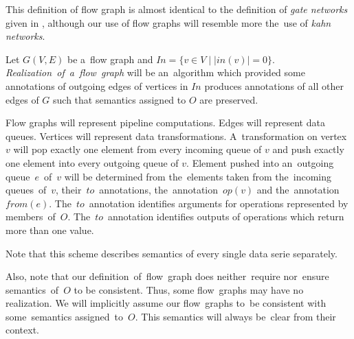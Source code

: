 This definition of flow graph is almost identical to the definition of \emph{gate networks} given in \cite{ads}, although our use of flow graphs will resemble more the~use of \emph{kahn networks}.

\begin{define}
  Let $G(V,E)$ be a~flow graph and ${In = \{v \in V \mid |in(v)| = 0\}}$. \emph{Realization~of~a~flow~graph} will be an~algorithm which provided some annotations of outgoing edges of vertices in $In$ produces annotations of all other edges of $G$ such that semantics assigned to $O$ are preserved. 
\end{define}

Flow graphs will represent pipeline computations. Edges will represent data queues. Vertices will represent data transformations. A~transformation on vertex~$v$ will pop exactly one element from every incoming queue of $v$ and push exactly one element into every outgoing queue of $v$. Element pushed into an~outgoing queue~$e$~of~$v$ will be determined from the~elements taken from the~incoming queues~of~$v$, their~$to$~annotations, the~annotation~$op(v)$ and the~annotation~$from(e)$. The~$to$~annotation identifies arguments for operations represented by members~of~$O$. The~$to$~annotation identifies outputs of operations which return more than one value.

\parspace

Note that this scheme describes semantics of every single data serie separately. 

\parspace

Also, note that our definition~of~flow~graph does neither~require nor~ensure semantics~of~$O$ to be consistent. Thus, some flow~graphs may have no realization. We will implicitly assume our flow~graphs to~be consistent with some~semantics assigned~to~$O$. This semantics will always be~clear from their context.

